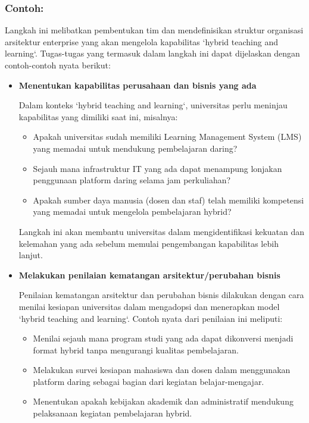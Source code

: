 \subsubsection{Contoh:}

Langkah ini melibatkan pembentukan tim dan mendefinisikan struktur organisasi arsitektur enterprise yang akan mengelola kapabilitas `hybrid teaching and learning`. Tugas-tugas yang termasuk dalam langkah ini dapat dijelaskan dengan contoh-contoh nyata berikut:

\begin{itemize}
	\item \textbf{Menentukan kapabilitas perusahaan dan bisnis yang ada}
	
	Dalam konteks `hybrid teaching and learning`, universitas perlu meninjau kapabilitas yang dimiliki saat ini, misalnya:
	\begin{itemize}
		\item Apakah universitas sudah memiliki Learning Management System (LMS) yang memadai untuk mendukung pembelajaran daring?
		\item Sejauh mana infrastruktur IT yang ada dapat menampung lonjakan penggunaan platform daring selama jam perkuliahan?
		\item Apakah sumber daya manusia (dosen dan staf) telah memiliki kompetensi yang memadai untuk mengelola pembelajaran hybrid?
	\end{itemize}
	
	Langkah ini akan membantu universitas dalam mengidentifikasi kekuatan dan kelemahan yang ada sebelum memulai pengembangan kapabilitas lebih lanjut.
	
	\item \textbf{Melakukan penilaian kematangan arsitektur/perubahan bisnis}
	
	Penilaian kematangan arsitektur dan perubahan bisnis dilakukan dengan cara menilai kesiapan universitas dalam mengadopsi dan menerapkan model `hybrid teaching and learning`. Contoh nyata dari penilaian ini meliputi:
	\begin{itemize}
		\item Menilai sejauh mana program studi yang ada dapat dikonversi menjadi format hybrid tanpa mengurangi kualitas pembelajaran.
		\item Melakukan survei kesiapan mahasiswa dan dosen dalam menggunakan platform daring sebagai bagian dari kegiatan belajar-mengajar.
		\item Menentukan apakah kebijakan akademik dan administratif mendukung pelaksanaan kegiatan pembelajaran hybrid.
	\end{itemize}
	

\end{itemize}
